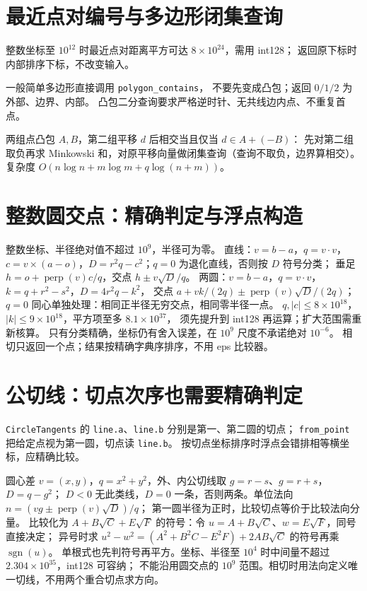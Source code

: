 \section{最近点对编号与多边形闭集查询}
整数坐标至 $10^{12}$ 时最近点对距离平方可达 $8\times10^{24}$，需用 int128；
返回原下标时内部排序下标，不改变输入。

一般简单多边形直接调用 \texttt{polygon\_contains}，
不要先变成凸包；返回 $0/1/2$ 为外部、边界、内部。
凸包二分查询要求严格逆时针、无共线边内点、不重复首点。

两组点凸包 $A,B$，第二组平移 $d$ 后相交当且仅当 $d\in A+(-B)$：
先对第二组取负再求 Minkowski 和，对原平移向量做闭集查询（查询不取负，边界算相交）。
复杂度 $O(n\log n+m\log m+q\log(n+m))$。

\section{整数圆交点：精确判定与浮点构造}
整数坐标、半径绝对值不超过 $10^9$，半径可为零。
直线：$v=b-a$，$q=v\cdot v$，$c=v\times(a-o)$，$D=r^2q-c^2$；$q=0$ 为退化直线，否则按 $D$ 符号分类；
垂足 $h=o+\operatorname{perp}(v)c/q$，交点 $h\pm v\sqrt D/q$。
两圆：$v=b-a$，$q=v\cdot v$，$k=q+r^2-s^2$，$D=4r^2q-k^2$，
交点 $a+vk/(2q)\pm\operatorname{perp}(v)\sqrt D/(2q)$；
$q=0$ 同心单独处理：相同正半径无穷交点，相同零半径一点。
$q,|c|\le8\times10^{18}$，$|k|\le9\times10^{18}$，平方项至多 $8.1\times10^{37}$，
须先提升到 int128 再运算；扩大范围需重新核算。
只有分类精确，坐标仍有舍入误差，在 $10^9$ 尺度不承诺绝对 $10^{-6}$。
相切只返回一个点；结果按精确字典序排序，不用 eps 比较器。

\section{公切线：切点次序也需要精确判定}
\texttt{CircleTangents} 的 \texttt{line.a}、\texttt{line.b} 分别是第一、第二圆的切点；
\texttt{from\_point} 把给定点视为第一圆，切点读 \texttt{line.b}。
按切点坐标排序时浮点会错排相等横坐标，应精确比较。

圆心差 $v=(x,y)$，$q=x^2+y^2$，外、内公切线取 $g=r-s$、$g=r+s$，$D=q-g^2$；
$D<0$ 无此类线，$D=0$ 一条，否则两条。单位法向 $n=(vg\pm\operatorname{perp}(v)\sqrt D)/q$；
第一圆半径为正时，比较切点等价于比较法向分量。
比较化为 $A+B\sqrt C+E\sqrt F$ 的符号：令 $u=A+B\sqrt C$、$w=E\sqrt F$，同号直接决定；
异号时求 $u^2-w^2=(A^2+B^2C-E^2F)+2AB\sqrt C$ 的符号再乘 $\operatorname{sgn}(u)$。
单根式也先判符号再平方。坐标、半径至 $10^4$ 时中间量不超过 $2.304\times10^{35}$，int128 可容纳；
不能沿用圆交点的 $10^9$ 范围。相切时用法向定义唯一切线，不用两个重合切点求方向。

